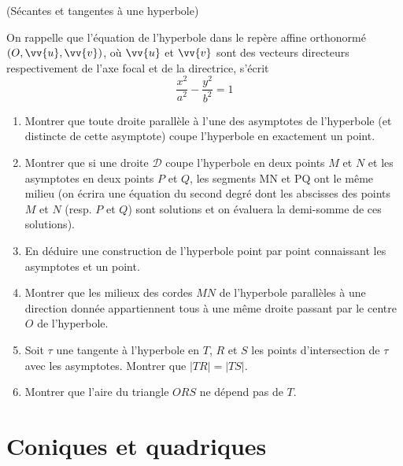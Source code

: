 \documentclass[a4paper,12pt,reqno]{amsart}
\begin{document}
\begin{exo} (Sécantes et tangentes à une hyperbole)


On rappelle que l'équation de l'hyperbole dans le repère affine orthonormé $(O,\vv{u},\vv{v})$, où $\vv{u}$ et $\vv{v}$ sont des vecteurs directeurs respectivement de l'axe focal et de la directrice, s'écrit
$$
  \frac{x^{2}}{a^{2}}-\frac{y^{2}}{b^{2}}=1
$$

\begin{enumerate}
  \item Montrer que toute droite parallèle à l'une des asymptotes de l'hyperbole (et distincte de cette asymptote) coupe l'hyperbole en exactement un point.

  \item Montrer que si une droite $\mathcal{D}$ coupe l'hyperbole en deux points $M$ et $N$ et les asymptotes en deux points $P$ et $Q$, les segments MN et PQ ont le même milieu (on écrira une équation du second degré dont les abscisses des points $M$ et $N$ (resp. $P$ et $Q$) sont solutions et on évaluera la demi-somme de ces solutions).

  \item En déduire une construction de l'hyperbole point par point connaissant les asymptotes et un point.

  \item Montrer que les milieux des cordes $MN$ de l'hyperbole parallèles à une direction donnée appartiennent tous à une même droite passant par le centre $O$ de l'hyperbole.

  \item Soit $\tau$ une tangente à l'hyperbole en $T$, $R$ et $S$ les points d'intersection de $\tau$ avec les asymptotes. Montrer que $| TR | = | TS |$.

  \item Montrer que l'aire du triangle $ORS$ ne dépend pas de $T$.
\end{enumerate}

\end{exo}

\section{Coniques et quadriques}
\end{document}
